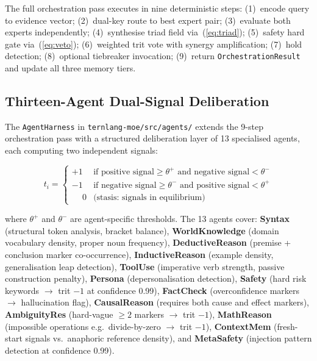 \documentclass[11pt,a4paper]{article}
\begin{document}
The full orchestration pass executes in nine deterministic steps:
(1)~encode query to evidence vector;
(2)~dual-key route to best expert pair;
(3)~evaluate both experts independently;
(4)~synthesise triad field via~(\ref{eq:triad});
(5)~safety hard gate via~(\ref{eq:veto});
(6)~weighted trit vote with synergy amplification;
(7)~hold detection;
(8)~optional tiebreaker invocation;
(9)~return \texttt{OrchestrationResult} and update all three memory tiers.

\subsection{Thirteen-Agent Dual-Signal Deliberation}
\label{subsec:harness}

The \texttt{AgentHarness} in \texttt{ternlang-moe/src/agents/} extends the
9-step orchestration pass with a structured deliberation layer of 13
specialised agents, each computing two independent signals:

\begin{equation}
  t_i = \begin{cases}
    +1 & \text{if positive signal} \geq \theta^+ \text{ and negative signal} < \theta^- \\
    -1 & \text{if negative signal} \geq \theta^- \text{ and positive signal} < \theta^+  \\
    \phantom{+}0 & \text{(stasis: signals in equilibrium)}
  \end{cases}
  \label{eq:dual_signal}
\end{equation}

where $\theta^+$ and $\theta^-$ are agent-specific thresholds. The 13 agents cover:
\textbf{Syntax} (structural token analysis, bracket balance),
\textbf{WorldKnowledge} (domain vocabulary density, proper noun frequency),
\textbf{DeductiveReason} (premise + conclusion marker co-occurrence),
\textbf{InductiveReason} (example density, generalisation leap detection),
\textbf{ToolUse} (imperative verb strength, passive construction penalty),
\textbf{Persona} (depersonalisation detection),
\textbf{Safety} (hard risk keywords $\to$ trit $-1$ at confidence 0.99),
\textbf{FactCheck} (overconfidence markers $\to$ hallucination flag),
\textbf{CausalReason} (requires both cause and effect markers),
\textbf{AmbiguityRes} (hard-vague $\geq 2$ markers $\to$ trit $-1$),
\textbf{MathReason} (impossible operations e.g.\ divide-by-zero $\to$ trit $-1$),
\textbf{ContextMem} (fresh-start signals vs.\ anaphoric reference density),
and \textbf{MetaSafety} (injection pattern detection at confidence 0.99).
\end{document}
